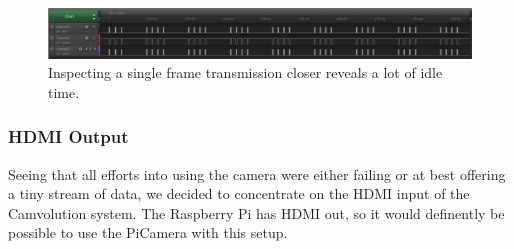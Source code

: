 \begin{figure}
    \centering
    \includegraphics[width=\linewidth]{img/logic/1frame}
    \caption{Inspecting a single frame transmission closer reveals a lot of idle time.}
    \label{fig:Logic1Frame}
\end{figure}

\subsubsection{HDMI Output}
Seeing that all efforts into using the camera were either failing or at best offering a tiny stream of data,
we decided to concentrate on the HDMI input of the Camvolution system.
The Raspberry Pi has HDMI out, so it would definently be possible to use the PiCamera with this setup.

